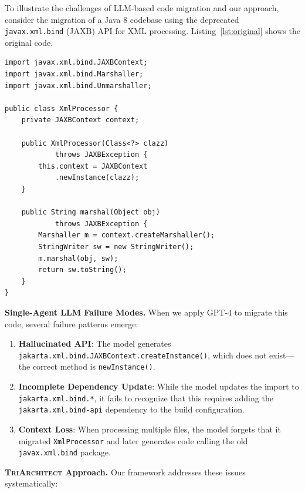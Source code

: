 \documentclass[sigconf,review,anonymous]{acmart}
\begin{document}
To illustrate the challenges of LLM-based code migration and our approach, consider the migration of a Java 8 codebase using the deprecated \texttt{javax.xml.bind} (JAXB) API for XML processing. Listing~\ref{lst:original} shows the original code.

\begin{lstlisting}[caption={Original Java 8 code using deprecated JAXB API},label=lst:original]
import javax.xml.bind.JAXBContext;
import javax.xml.bind.Marshaller;
import javax.xml.bind.Unmarshaller;

public class XmlProcessor {
    private JAXBContext context;
    
    public XmlProcessor(Class<?> clazz) 
            throws JAXBException {
        this.context = JAXBContext
            .newInstance(clazz);
    }
    
    public String marshal(Object obj) 
            throws JAXBException {
        Marshaller m = context.createMarshaller();
        StringWriter sw = new StringWriter();
        m.marshal(obj, sw);
        return sw.toString();
    }
}
\end{lstlisting}

\textbf{Single-Agent LLM Failure Modes.} When we apply GPT-4 to migrate this code, several failure patterns emerge:

\begin{enumerate}
    \item \textbf{Hallucinated API}: The model generates \texttt{jakarta.xml.bind.JAXBContext.createInstance()}, which does not exist---the correct method is \texttt{newInstance()}.
    
    \item \textbf{Incomplete Dependency Update}: While the model updates the import to \texttt{jakarta.xml.bind.*}, it fails to recognize that this requires adding the \texttt{jakarta.xml.bind-api} dependency to the build configuration.
    
    \item \textbf{Context Loss}: When processing multiple files, the model forgets that it migrated \texttt{XmlProcessor} and later generates code calling the old \texttt{javax.xml.bind} package.
\end{enumerate}

\textbf{\textsc{TriArchitect} Approach.} Our framework addresses these issues systematically:
\end{document}
